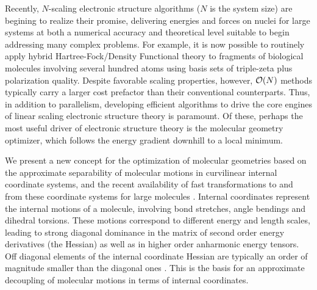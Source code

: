 \documentclass[prl,aps,preprint,showpacs,superbib]{revtex4}
\begin{document}
Recently, $N$-scaling electronic structure algorithms ($N$ is the system size)  are begining to 
realize their promise, delivering energies and forces on nuclei for large systems at 
both a numerical accuracy and theoretical level suitable to begin addressing many complex 
problems.  For example, it is now possible to routinely apply hybrid Hartree-Fock/Density 
Functional theory to fragments of biological molecules involving 
several hundred atoms using basis sets of triple-zeta plus polarization quality.  
Despite favorable scaling properties, however, ${\cal O}(N)$ methods typically carry a larger 
cost prefactor than their conventional counterparts.  Thus, 
in addition to parallelism, developing efficient algorithms to drive the core engines of 
linear scaling electronic structure theory is paramount.  Of these, perhaps the most useful 
driver of electronic structure theory is the molecular geometry optimizer, which follows 
the energy gradient downhill to a local minimum.   

We present a new concept for the optimization of molecular geometries based on
the approximate separability of molecular motions in curvilinear internal coordinate 
systems, and the recent availability of fast transformations to and from these coordinate systems 
for large molecules \cite{paizs_coordtrf1,nemeth_coordtrf1,paizs_coordtrf2,nemeth_coordtrf2}.  
Internal coordinates represent the internal motions of a molecule, involving  bond stretches, angle 
bendings and dihedral torsions.  These motions correspond to different  energy and length 
scales, leading to strong diagonal dominance in the matrix of second order energy derivatives 
(the Hessian) as well as in higher order anharmonic energy tensors.  Off diagonal elements of the 
internal coordinate Hessian are typically an order of magnitude smaller than the diagonal ones
\cite{pulay_69,fogarasi_diaghess,Pulay_natural_internals,pulay_review,pulay_dynamics}.
This is the basis for an approximate decoupling of molecular motions in terms of internal coordinates.
\end{document}
